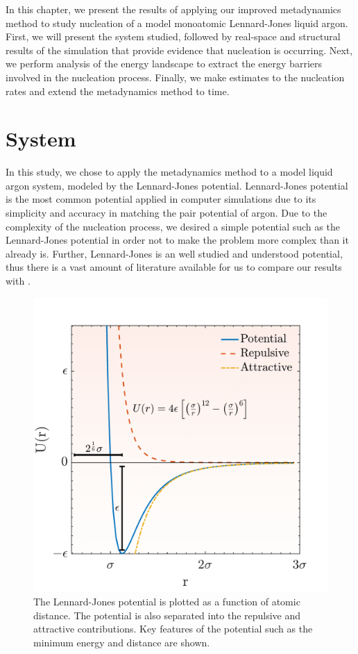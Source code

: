 In this chapter, we present the results of applying our improved metadynamics method to study nucleation of a model monoatomic Lennard-Jones liquid argon.  First, we will present the system studied, followed by real-space and structural results of the simulation that provide evidence that nucleation is occurring.  Next, we perform analysis of the energy landscape to extract the energy barriers involved in the nucleation process.  Finally, we make estimates to the nucleation rates and extend the metadynamics method to time.  

\section{System}
In this study, we chose to apply the metadynamics method to a model liquid argon system, modeled by the Lennard-Jones potential.  Lennard-Jones potential is the most common potential applied in computer simulations due to its simplicity and accuracy in matching the pair potential of argon.  Due to the complexity of the nucleation process, we desired a simple potential such as the Lennard-Jones potential in order not to make the problem more complex than it already is.  Further, Lennard-Jones is an  well studied and understood potential, thus there is a vast amount of literature available for us to compare our results with \cite{HANSEN2006v}.  

\begin{figure}[h]
	\centering
	\includegraphics[width = .5\textwidth]{./Figures/Nucleation/LJ_potential.pdf}
	\caption[The Lennard-Jones potential is plotted as a function of atomic distance.  The potential is also separated into the repulsive and attractive contributions.  Key features of the potential such as the minimum energy and distance are shown.]{The Lennard-Jones potential is plotted as a function of atomic distance.  The potential is also separated into the repulsive and attractive contributions.  Key features of the potential such as the minimum energy and distance are shown. \cite{Jones463}}
	\label{LJ}
\end{figure}

